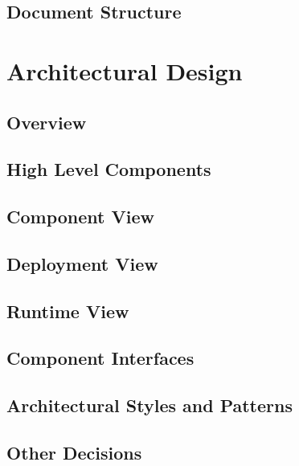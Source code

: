 \documentclass[a4paper,12pt]{report}
\begin{document}
\section{Document Structure}


\chapter{Architectural Design}
\label{ch:Arch_Design}

\section{Overview}


\newpage
\section{High Level Components}\label{high_level_comps}


\section{Component View}\label{component_view}


\section{Deployment View}\label{deployment_view}


\section{Runtime View}\label{runtime_view}


\section{Component Interfaces}\label{component_if}


\section{Architectural Styles and Patterns}\label{sel_arch_styles_patterns}


\section{Other Decisions}\label{other_decisions}

\end{document}
